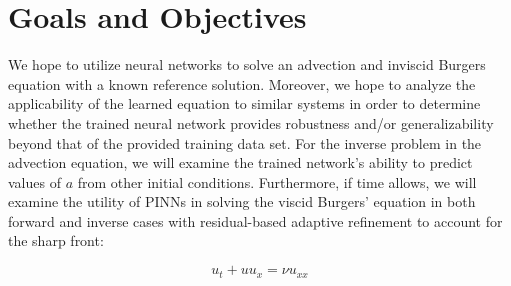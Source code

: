 \documentclass[letterpaper,12pt]{article}
\begin{document}
    \section{Goals and Objectives}\label{sec:goals}
    We hope to utilize neural networks to solve an advection and inviscid Burgers equation with a known reference 
    solution. Moreover, we hope to analyze the applicability of the learned equation to similar systems in order to 
    determine whether the trained neural network provides robustness and/or generalizability beyond that of the provided
    training data set. For the inverse problem in the advection equation, we will examine the trained network's ability 
    to predict values of $a$ from other initial conditions. Furthermore, if time allows, we will examine the utility
    of PINNs in solving the viscid Burgers' equation in both forward and inverse cases with residual-based
    adaptive refinement to account for the sharp front:

    $$
    u_t + u u_x = \nu u_{xx}
    $$

    \pagebreak
    \nocite{*}
    
    
\end{document}
